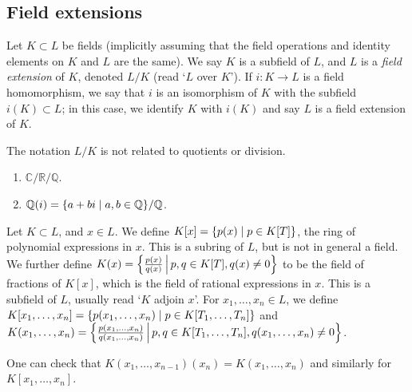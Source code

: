 \subsection{Field extensions}
\begin{definition}
	Let \( K \subset L \) be fields (implicitly assuming that the field operations and identity elements on \( K \) and \( L \) are the same).
	We say \( K \) is a subfield of \( L \), and \( L \) is a \emph{field extension} of \( K \), denoted \( L / K \) (read `\( L \) over \( K \)').
	If \( i \colon K \to L \) is a field homomorphism, we say that \( i \) is an isomorphism of \( K \) with the subfield \( i(K) \subset L \); in this case, we identify \( K \) with \( i(K) \) and say \( L \) is a field extension of \( K \).
\end{definition}
\begin{remark}
	The notation \( L / K \) is not related to quotients or division.
\end{remark}
\begin{example}
	\begin{enumerate}
		\item \( \mathbb C / \mathbb R / \mathbb Q \).
		\item \( \mathbb Q(i) = \qty{a + bi \mid a,b \in \mathbb Q} / \mathbb Q \).
	\end{enumerate}
\end{example}
\begin{definition}
	Let \( K \subset L \), and \( x \in L \).
	We define \( K[x] = \qty{p(x) \mid p \in K[T]} \), the ring of polynomial expressions in \( x \).
	This is a subring of \( L \), but is not in general a field.
	We further define \( K(x) = \qty{\frac{p(x)}{q(x)} \,\middle|\,p,q \in K[T], q(x) \neq 0} \) to be the field of fractions of \( K[x] \), which is the field of rational expressions in \( x \).
	This is a subfield of \( L \), usually read `\( K \) adjoin \( x \)'.
	For \( x_1, \dots, x_n \in L \), we define \( K[x_1, \dots, x_n] = \qty{p(x_1, \dots, x_n) \mid p \in K[T_1, \dots, T_n]} \) and \( K(x_1, \dots, x_n) = \qty{\frac{p(x_1, \dots, x_n)}{q(x_1, \dots, x_n)} \,\middle|\,p,q \in K[T_1, \dots, T_n], q(x_1, \dots, x_n) \neq 0} \).
\end{definition}
\begin{remark}
	One can check that \( K(x_1, \dots, x_{n-1})(x_n) = K(x_1, \dots, x_n) \) and similarly for \( K[x_1, \dots, x_n] \).
\end{remark}

